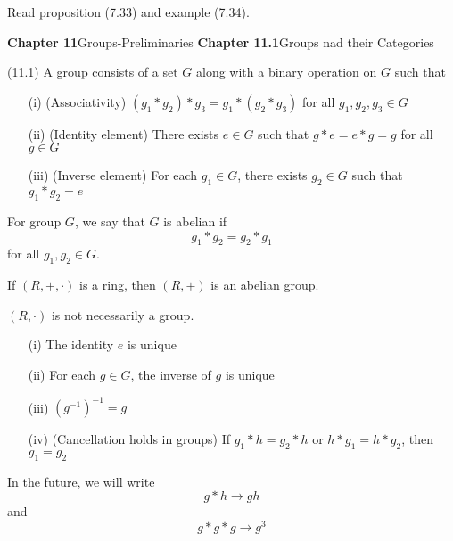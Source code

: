 \vspace{2ex}
\begin{rmk}
Read proposition (7.33) and example (7.34).
\end{rmk}
\vspace{2ex}
{\bf Chapter 11}\hspace{2ex}Groups-Preliminaries
\newline
\newline
{\bf Chapter 11.1}\hspace{2ex}Groups nad their Categories\
\newline
\begin{defi}
(11.1) A group consists of a set $G$ along with a binary operation on $G$ such that 
\begin{itemize}
\item[(i)] (Associativity) $(g_1*g_2)*g_3=g_1*(g_2*g_3)$ for all $g_1,g_2,g_3\in G$
\item[(ii)] (Identity element) There exists $e\in G$ such that $g*e=e*g=g$ for all $g\in G$
\item[(iii)] (Inverse element) For each $g_1\in G$, there exists $g_2\in G$ such that $g_1*g_2=e$ 
\end{itemize}
\end{defi}
\vspace{2ex}
\begin{defi}
For group $G$, we say that $G$ is abelian if
\[g_1*g_2=g_2*g_1\]
for all $g_1,g_2\in G$. 
\end{defi}
\vspace{2ex}
\begin{ex}
If $(R,+,\cdot )$ is a ring, then $(R,+)$ is an abelian group. 
\end{ex}
\vspace{2ex}
\begin{rmk}
$(R,\cdot )$ is not necessarily a group. 
\end{rmk}
\vspace{2ex}
\begin{rmk}
\begin{itemize}
\item[(i)] The identity $e$ is unique
\item[(ii)] For each $g\in G$, the inverse of $g$ is unique
\item[(iii)] $(g^{-1})^{-1}=g$
\item[(iv)] (Cancellation holds in groups) If $g_1*h=g_2*h$ or $h*g_1=h*g_2$, then $g_1=g_2$
\end{itemize}
\end{rmk}
\vspace{2ex}
\begin{rmk}
In the future, we will write
\[g*h \rightarrow gh\]
and
\[g*g*g\rightarrow g^3\]
\end{rmk}
\vspace{2ex}
